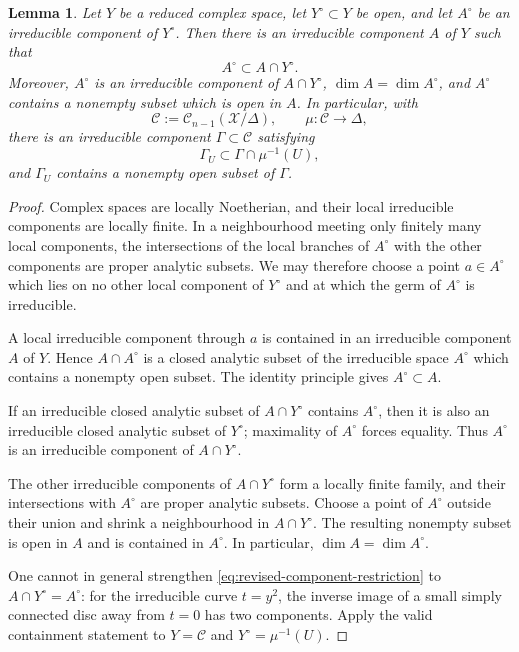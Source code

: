 \documentclass[10pt,a4paper]{amsart}
\newtheorem{lemma}{Lemma}
\newcommand{\cC}{\mathcal C}
\newcommand{\cX}{\mathcal X}
\begin{document}
\begin{lemma}\label{lem:revised-global-component}
Let $Y$ be a reduced complex space, let $Y^\circ\subset Y$ be open, and let
$A^\circ$ be an irreducible component of $Y^\circ$.  Then there is an irreducible component $A$ of $Y$ such that
\begin{equation}\label{eq:revised-component-restriction}
 A^\circ\subset A\cap Y^\circ.
\end{equation}
Moreover, $A^\circ$ is an irreducible component of $A\cap Y^\circ$,
$\dim A=\dim A^\circ$, and $A^\circ$ contains a nonempty subset which is
open in $A$.  In particular, with
\[
 \mathscr C:=\cC_{n-1}(\cX/\Delta),\qquad
 \mu:\mathscr C\to\Delta,
\]
there is an irreducible component $\Gamma\subset\mathscr C$ satisfying
\begin{equation*}
 \Gamma_U\subset\Gamma\cap\mu^{-1}(U),
\end{equation*}
and $\Gamma_U$ contains a nonempty open subset of $\Gamma$.
\end{lemma}

\begin{proof}
Complex spaces are locally Noetherian, and their local irreducible
components are locally finite.  In a neighbourhood meeting only finitely
many local components, the intersections of the local branches of
$A^\circ$ with the other components are proper analytic subsets.  We may
therefore choose a point $a\in A^\circ$ which lies on no other local
component of $Y^\circ$ and at which the germ of $A^\circ$ is irreducible.

A local irreducible component through $a$ is
contained in an irreducible component $A$ of $Y$.  Hence
$A\cap A^\circ$ is a closed analytic subset of the irreducible space
$A^\circ$ which contains a nonempty open subset.  The identity principle
gives $A^\circ\subset A$.

If an irreducible closed analytic subset of
$A\cap Y^\circ$ contains $A^\circ$, then it is also an irreducible closed
analytic subset of $Y^\circ$; maximality of $A^\circ$ forces equality.
Thus $A^\circ$ is an irreducible component of $A\cap Y^\circ$.

The other irreducible components of $A\cap Y^\circ$ form a locally finite
family, and their intersections with $A^\circ$ are proper analytic
subsets.  Choose a point of $A^\circ$ outside their union and shrink a
neighbourhood in $A\cap Y^\circ$.  The resulting nonempty subset is open
in $A$ and is contained in $A^\circ$.  In particular,
$\dim A=\dim A^\circ$.

One cannot in general strengthen \eqref{eq:revised-component-restriction} to
$A\cap Y^\circ=A^\circ$: for the irreducible curve $t=y^2$, the inverse
image of a small simply connected disc away from $t=0$ has two components.
Apply the valid containment statement to $Y=\mathscr C$ and
$Y^\circ=\mu^{-1}(U)$.
\end{proof}
\end{document}
